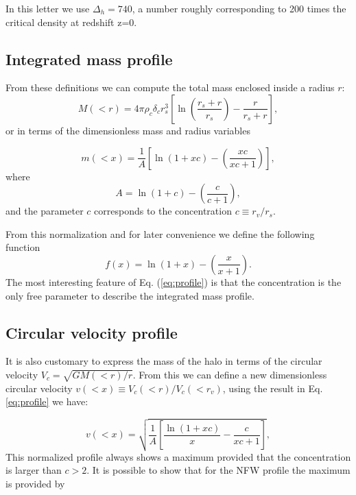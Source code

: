 \documentclass{emulateapj}
\begin{document}
In this letter we use $\Delta_h=740$, a number roughly corresponding to
200 times the critical density at redshift z=0. 


\subsection{Integrated mass profile}

From these definitions we can compute the total mass enclosed inside a
radius $r$:
\begin{equation}
M(<r) = 4\pi\rho_c\delta_c  r_s^3\left[\ln \left
  (\frac{r_s+r}{r_s}\right) - \frac{r}{r_s+r}\right],
\end{equation}
%
or in terms of the dimensionless mass and radius variables

\begin{equation}
m(<x) =
\frac{1}{A}\left[\ln\left(1+xc\right)-\left(\frac{xc}{xc+1}\right)\right],
\label{eq:profile}
\end{equation}
%
where
%
\begin{equation}
A=\ln\left(1+c\right)-\left(\frac{c}{c+1}\right),
\end{equation}
%
and the parameter $c$ corresponds to the concentration $c\equiv
r_v/r_s$.

From this normalization and for later convenience we define the
following function
%
\begin{equation}
f(x) = \ln\left(1+x\right)-\left(\frac{x}{x+1}\right).
\label{eq:f_NFW}
\end{equation}
%
The most interesting feature of Eq. (\ref{eq:profile}) is that the
concentration is the only free parameter to describe the integrated
mass profile.
 
\subsection{Circular velocity profile}

It is also customary to express the mass of the halo in terms of the
circular velocity $V_{c}=\sqrt{GM(<r)/r}$.  From this we can define a
new dimensionless circular velocity $v(<x)\equiv
V_{c}(<r)/V_{c}(<r_v)$, using the result in Eq. \ref{eq:profile} we
have:

\begin{equation}
v(<x)=\sqrt{\frac{1}{A}\left[\frac{\ln\left(1+xc\right)}{x}-\frac{c}{xc+1}\right]},
\end{equation}
%
This normalized profile always shows a maximum provided that the
concentration is larger than $c>2$.  It is possible to show that for
the NFW profile the maximum is provided by
\end{document}
